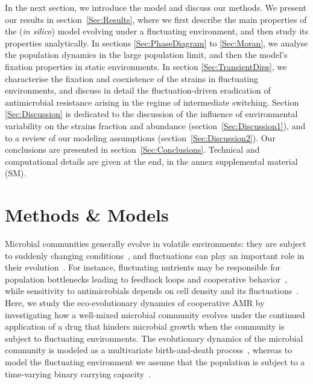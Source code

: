 \documentclass{article}
\begin{document}
In the next section, we introduce the model and discuss our methods. We present our results in section~\ref{Sec:Results}, where we first describe the main properties of the ({\it in silico}) model evolving under a fluctuating environment, and then study its properties analytically. In sections \ref{Sec:PhaseDiagram} to \ref{Sec:Moran}, we analyse the population dynamics in the large population limit, and then the model's fixation properties in static environments. In section \ref{Sec:TransientDips}, we characterise the fixation and coexistence of the strains in fluctuating environments, and discuss in detail the fluctuation-driven eradication of antimicrobial resistance arising in the regime of intermediate switching. Section \ref{Sec:Discussion} is dedicated to the discussion of the influence of environmental variability on the strains fraction and abundance (section~\ref{Sec:Discussion1}), and to a review of our modeling assumptions (section~\ref{Sec:Discussion2}). Our conclusions are presented in section~\ref{Sec:Conclusions}. Technical and computational details are given at the end, in the annex supplemental material (SM).


\section{Methods \& Models}

Microbial communities generally evolve in volatile environments: they are subject to suddenly changing conditions~\cite{shade2012,stegen2012}, and fluctuations can play an important role in their evolution~\cite{Grime73,Miller11,Fox13,Chesson94,Chesson00,Coates18,Ellner19,Murugan21}. For instance, fluctuating nutrients may be responsible for population bottlenecks leading to feedback loops and cooperative behavior~\cite{Wahl02,Brockhurst07,Brockhurst07b,Patwas09}, while sensitivity to antimicrobials depends on cell density and its fluctuations~\cite{brook2004beta,Yurtsev13,vega2014collective,meredith2015collective,bottery2016selective}. Here, we study the eco-evolutionary dynamics of cooperative AMR by investigating how a well-mixed microbial community evolves under the continued application of a drug that hinders microbial growth when the community is subject to fluctuating environments. The evolutionary dynamics of the microbial community is modeled as a multivariate birth-and-death process~\cite{Gardiner,VanKampen,Blythe07}, whereas to model the fluctuating environment we assume that the population is subject to a time-varying binary carrying capacity~\cite{Bena2006,HL06,taitelbaum2020population,taitelbaum2023evolutionary,hufton2016intrinsic}.
\end{document}
